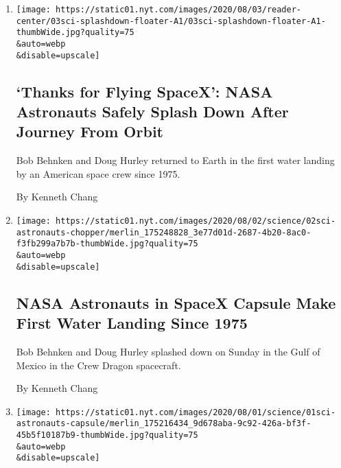 \begin{enumerate}
\def\labelenumi{\arabic{enumi}.}
\item
  \href{/2020/08/02/science/spacex-astronauts-splashdown.html}{}

  \texttt{[image: https://static01.nyt.com/images/2020/08/03/reader-center/03sci-splashdown-floater-A1/03sci-splashdown-floater-A1-thumbWide.jpg?quality=75\\\&auto=webp\\\&disable=upscale]}

  \hypertarget{thanks-for-flying-spacex-nasa-astronauts-safely-splash-down-after-journey-from-orbit}{%
  \subsection{`Thanks for Flying SpaceX': NASA Astronauts Safely Splash
  Down After Journey From
  Orbit}\label{thanks-for-flying-spacex-nasa-astronauts-safely-splash-down-after-journey-from-orbit}}

  Bob Behnken and Doug Hurley returned to Earth in the first water
  landing by an American space crew since 1975.

  By Kenneth Chang
\item
  \href{/2020/08/02/science/spacex-nasa-return.html}{}

  \texttt{[image: https://static01.nyt.com/images/2020/08/02/science/02sci-astronauts-chopper/merlin\_175248828\_3e77d01d-2687-4b20-8ac0-f3fb299a7b7b-thumbWide.jpg?quality=75\\\&auto=webp\\\&disable=upscale]}

  \hypertarget{nasa-astronauts-in-spacex-capsule-make-first-water-landing-since-1975}{%
  \subsection{NASA Astronauts in SpaceX Capsule Make First Water Landing
  Since
  1975}\label{nasa-astronauts-in-spacex-capsule-make-first-water-landing-since-1975}}

  Bob Behnken and Doug Hurley splashed down on Sunday in the Gulf of
  Mexico in the Crew Dragon spacecraft.

  By Kenneth Chang
\item
  \href{/2020/08/01/science/nasa-spacex-astronauts.html}{}

  \texttt{[image: https://static01.nyt.com/images/2020/08/01/science/01sci-astronauts-capsule/merlin\_175216434\_9d678aba-9c92-426a-bf3f-45b5f10187b9-thumbWide.jpg?quality=75\\\&auto=webp\\\&disable=upscale]}

  \hypertarget{spacex-crew-dragon-departs-carrying-nasa-astronauts-toward-home}{%
}
\end{enumerate}
